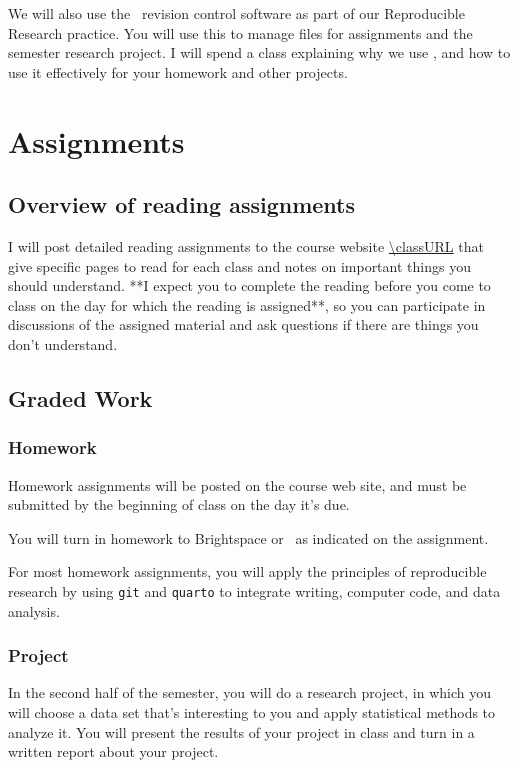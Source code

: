 \documentclass[11pt,twoside]{jgsyllabus}\usepackage[]{graphicx}\usepackage[]{xcolor}
\begin{document}
We will also use the \git\ revision control software as part of our
Reproducible Research practice. You will use this to manage files
for assignments and the semester research project.
I will spend a class explaining why we use \git, and how
to use it effectively for your homework and other projects.

\section{Assignments}

\subsection[Reading assignments]{Overview of reading assignments}

I will post detailed reading assignments to the course website
\url{\classURL}
that give specific pages to read for each class
and notes on important things you should understand.
**I expect you to complete the reading before you come to class on the day
for which the reading is assigned**,
so you can participate in discussions of the
assigned material and ask questions if there are things you don't understand.

\subsection{Graded Work}

\subsubsection{Homework}

Homework assignments will be posted on the course web site, and must be
submitted by the beginning of class on the day it's due.

You will turn in homework to Brightspace or \GitHub\ as indicated on the
assignment.

For most homework assignments, you will apply the principles of reproducible
research by using \verb+git+ and \verb+quarto+ to integrate writing, computer
code, and data analysis.

\subsubsection{Project}

In the second half of the semester, you will do a research project,
in which you will choose a data set that's interesting to you and apply
statistical methods to analyze it. You will present the results of your
project in class and turn in a written report about your project.
\end{document}
